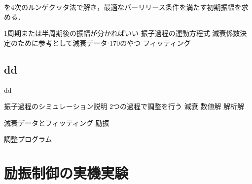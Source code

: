            


          



          

          
          
          
          
            を4次のルンゲクッタ法で解き，最適なバーリリース条件を満たす初期振幅を求める．
          
          


          1周期または半周期後の振幅が分かればいい
          振子過程の運動方程式
          減衰係数決定のために参考として減衰データ-170のやつ
          フィッティング


          

        \subsection{dd}
        
          dd

        振子過程のシミュレーション説明
        2つの過程で調整を行う
          減衰
            数値解  
            解析解
            
            減衰データとフィッティング
          励振

          調整プログラム
        \section{励振制御の実機実験}


